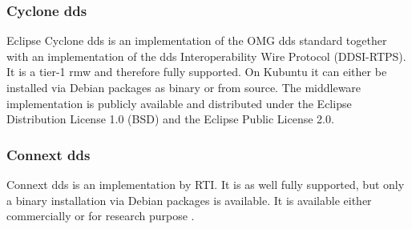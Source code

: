 \subsubsection*{Cyclone \gls{dds}}
Eclipse Cyclone \gls{dds} is an implementation of the OMG \gls{dds} standard together with an implementation of the \gls{dds} Interoperability Wire Protocol (DDSI-RTPS). It is a tier-1 \gls{rmw} and therefore fully supported. On Kubuntu it can either be installed via Debian packages as binary or from source. The middleware implementation is publicly available and distributed under the Eclipse Distribution License 1.0 (BSD) and the Eclipse Public License 2.0. \cite{anonymous_eclipse_2017, noauthor_eclipse_nodate}
\subsubsection*{Connext \gls{dds}}
Connext \gls{dds} is an implementation by RTI. It is as well fully supported, but only a binary installation via Debian packages is available. It is available either  commercially or for research purpose \cite{innovations_connext_nodate, noauthor_documentation_nodate}.

